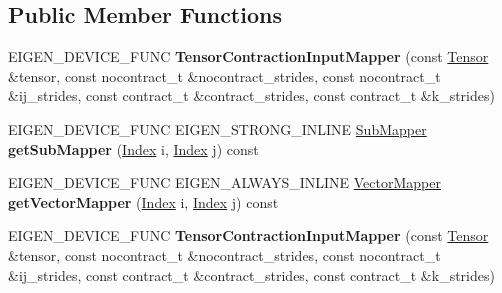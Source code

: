 \subsection*{Public Member Functions}
\begin{DoxyCompactItemize}
\item 
\mbox{\label{class_eigen_1_1internal_1_1_tensor_contraction_input_mapper_a72a8c2f63a0caf75b18307fdcbb58465}} 
E\+I\+G\+E\+N\+\_\+\+D\+E\+V\+I\+C\+E\+\_\+\+F\+U\+NC {\bfseries Tensor\+Contraction\+Input\+Mapper} (const \hyperlink{class_eigen_1_1_tensor}{Tensor} \&tensor, const nocontract\+\_\+t \&nocontract\+\_\+strides, const nocontract\+\_\+t \&ij\+\_\+strides, const contract\+\_\+t \&contract\+\_\+strides, const contract\+\_\+t \&k\+\_\+strides)
\item 
\mbox{\label{class_eigen_1_1internal_1_1_tensor_contraction_input_mapper_a417252fa70b4c7503fc760dd6c5003d5}} 
E\+I\+G\+E\+N\+\_\+\+D\+E\+V\+I\+C\+E\+\_\+\+F\+U\+NC E\+I\+G\+E\+N\+\_\+\+S\+T\+R\+O\+N\+G\+\_\+\+I\+N\+L\+I\+NE \hyperlink{class_eigen_1_1internal_1_1_tensor_contraction_sub_mapper}{Sub\+Mapper} {\bfseries get\+Sub\+Mapper} (\hyperlink{namespace_eigen_a62e77e0933482dafde8fe197d9a2cfde}{Index} i, \hyperlink{namespace_eigen_a62e77e0933482dafde8fe197d9a2cfde}{Index} j) const
\item 
\mbox{\label{class_eigen_1_1internal_1_1_tensor_contraction_input_mapper_af3627247282d759af8296bff58074d6f}} 
E\+I\+G\+E\+N\+\_\+\+D\+E\+V\+I\+C\+E\+\_\+\+F\+U\+NC E\+I\+G\+E\+N\+\_\+\+A\+L\+W\+A\+Y\+S\+\_\+\+I\+N\+L\+I\+NE \hyperlink{class_eigen_1_1internal_1_1_tensor_contraction_sub_mapper}{Vector\+Mapper} {\bfseries get\+Vector\+Mapper} (\hyperlink{namespace_eigen_a62e77e0933482dafde8fe197d9a2cfde}{Index} i, \hyperlink{namespace_eigen_a62e77e0933482dafde8fe197d9a2cfde}{Index} j) const
\item 
\mbox{\label{class_eigen_1_1internal_1_1_tensor_contraction_input_mapper_a72a8c2f63a0caf75b18307fdcbb58465}} 
E\+I\+G\+E\+N\+\_\+\+D\+E\+V\+I\+C\+E\+\_\+\+F\+U\+NC {\bfseries Tensor\+Contraction\+Input\+Mapper} (const \hyperlink{class_eigen_1_1_tensor}{Tensor} \&tensor, const nocontract\+\_\+t \&nocontract\+\_\+strides, const nocontract\+\_\+t \&ij\+\_\+strides, const contract\+\_\+t \&contract\+\_\+strides, const contract\+\_\+t \&k\+\_\+strides)

\end{DoxyCompactItemize}
